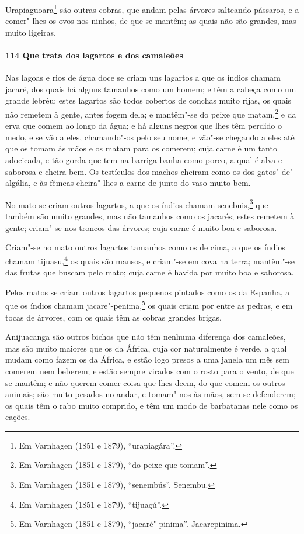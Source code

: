 \begin{linenumbers}
Urapiaguoara\footnote{ Em Varnhagen (1851 e 1879), ``urapiagára''.} são outras cobras, que
andam pelas árvores salteando pássaros, e a comer"-lhes os ovos nos ninhos, de que se
mantêm; as quais não são grandes, mas muito ligeiras.

\paragraph{114 Que trata dos lagartos e dos camaleões}\quad
Nas lagoas e rios de água doce se criam uns lagartos a que os índios chamam jacaré, dos
quais há alguns tamanhos como um homem; e têm a cabeça como um grande lebréu; estes
lagartos são todos cobertos de conchas muito rijas, os quais não remetem à gente, antes
fogem dela; e mantêm"-se do peixe que matam,\footnote{ Em Varnhagen (1851 e 1879), ``do
peixe que tomam''.} e da erva que comem ao longo da água; e há alguns negros que lhes têm
perdido o medo, e se vão a eles, chamando"-os pelo seu nome; e vão"-se chegando a eles até
que os tomam às mãos e os matam para os comerem; cuja carne é um tanto adocicada, e tão
gorda que tem na barriga banha como porco, a qual é alva e saborosa e cheira bem. Os
testículos dos machos cheiram como os dos gatos"-de"-algália, e às fêmeas cheira"-lhes a
carne de junto do vaso muito bem.

No mato se criam outros lagartos, a que os índios chamam senebuis,\footnote{ Em Varnhagen
(1851 e 1879), ``senembús''. Senembu.} que também são muito grandes, mas não tamanhos
como os jacarés; estes remetem à gente; criam"-se nos troncos das árvores; cuja carne é
muito boa e saborosa.

Criam"-se no mato outros lagartos tamanhos como os de cima, a que os índios chamam
tijuasu,\footnote{ Em Varnhagen (1851 e 1879), ``tijuaçú''.} os quais são mansos, e
criam"-se em cova na terra; mantêm"-se das frutas que buscam pelo mato; cuja carne é havida
por muito boa e saborosa.

Pelos matos se criam outros lagartos pequenos pintados como os da Espanha, a que os índios
chamam jacare"-penima,\footnote{ Em Varnhagen (1851 e 1879), ``jacaré"-pinima''.
Jacarepinima.} os quais criam por entre as pedras, e em tocas de árvores, com os quais
têm as cobras grandes brigas.

Anijuacanga são outros bichos que não têm nenhuma diferença dos camaleões, mas são muito
maiores que os da África, cuja cor naturalmente é verde, a qual mudam como fazem os da
África, e estão logo presos a uma janela um mês sem comerem nem beberem; e estão sempre
virados com o rosto para o vento, de que se mantêm; e não querem comer coisa que lhes
deem, do que comem os outros animais; são muito pesados no andar, e tomam"-nos às mãos, sem
se defenderem; os quais têm o rabo muito comprido, e têm um modo de barbatanas nele como
os cações.


\end{linenumbers}
